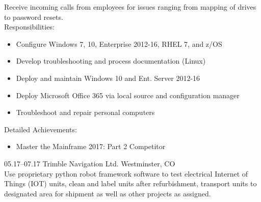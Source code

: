 \documentclass[]{cv-style}
\begin{document}
\begin{entrylist}
{  Receive incoming calls from employees for issues ranging from mapping of drives to password resets.\\
  Responsibilities:
    \begin{itemize}
  	  \item Configure Windows 7, 10, Enterprise 2012-16, RHEL 7, and z/OS
      \item Develop troubleshooting and process documentation (Linux)
      \item Deploy and maintain Windows 10 and Ent. Server 2012-16
      \item Deploy Microsoft Office 365 via local source and configuration manager
      \item Troubleshoot and repair personal computers
  \end{itemize}

  Detailed Achievements:
  \begin{itemize}
  	\item Master the Mainframe 2017: Part 2 Competitor
  \end{itemize}}
\entry
  {05.17--07.17}
  {Trimble Navigation Ltd.}
  {Westminster, CO}
  {\\
  Use proprietary python robot framework software to test electrical Internet of Things (IOT) units, clean and label units after refurbishment, transport units to designated area for shipment as well as other projects as assigned.}
\end{entrylist}
\end{document}
